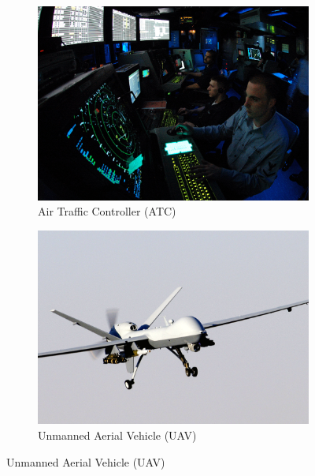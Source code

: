 \begin{figure}
\begin{subfigure}{.5\textwidth}
  \centering
  \includegraphics[width=.9\linewidth]{images/ATC.jpg}
  \caption{Air Traffic Controller (ATC)}
  \label{fig:sfigATC}
\end{subfigure} %
\begin{subfigure}{.5\textwidth}
  \centering
  \includegraphics[width=.9\linewidth]{images/UAV.jpg}
  \caption{Unmanned Aerial Vehicle (UAV)}
  \label{fig:sfigUAV}
\end{subfigure} 


\end{figure}
